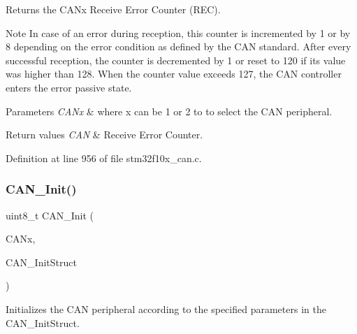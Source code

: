 Returns the C\+A\+Nx Receive Error Counter (R\+EC). 

\begin{DoxyNote}{Note}
In case of an error during reception, this counter is incremented by 1 or by 8 depending on the error condition as defined by the C\+AN standard. After every successful reception, the counter is decremented by 1 or reset to 120 if its value was higher than 128. When the counter value exceeds 127, the C\+AN controller enters the error passive state. 
\end{DoxyNote}

\begin{DoxyParams}{Parameters}
{\em C\+A\+Nx} & where x can be 1 or 2 to to select the C\+AN peripheral. \\
\hline
\end{DoxyParams}

\begin{DoxyRetVals}{Return values}
{\em C\+AN} & Receive Error Counter. \\
\hline
\end{DoxyRetVals}


Definition at line 956 of file stm32f10x\+\_\+can.\+c.

\mbox{\label{group___c_a_n___private___functions_ga9023c35a9ab931ad4513fc5d19b4bd6c}} 
\subsubsection{\texorpdfstring{C\+A\+N\+\_\+\+Init()}{CAN\_Init()}}
{\footnotesize\ttfamily uint8\+\_\+t C\+A\+N\+\_\+\+Init (\begin{DoxyParamCaption}\item[{\hyperlink{struct_c_a_n___type_def}{C\+A\+N\+\_\+\+Type\+Def} $\ast$}]{C\+A\+Nx,  }\item[{\hyperlink{struct_c_a_n___init_type_def}{C\+A\+N\+\_\+\+Init\+Type\+Def} $\ast$}]{C\+A\+N\+\_\+\+Init\+Struct }\end{DoxyParamCaption})}



Initializes the C\+AN peripheral according to the specified parameters in the C\+A\+N\+\_\+\+Init\+Struct. 


